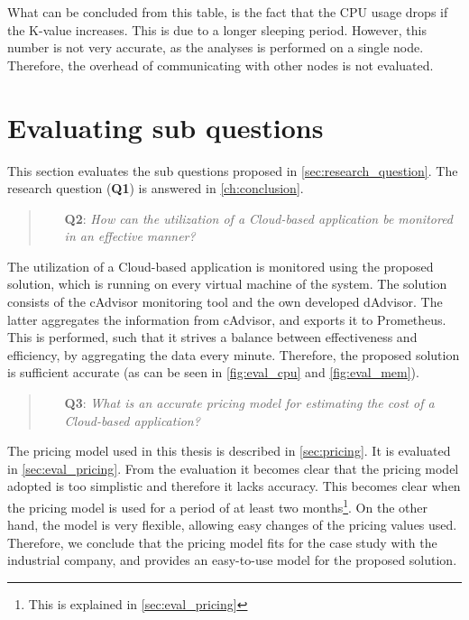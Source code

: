 \noindent
What can be concluded from this table, is the fact that the CPU usage drops if the K-value increases. This is due to a longer sleeping period. However, this number is not very accurate, as the analyses is performed on a single node. Therefore, the overhead of communicating with other nodes is not evaluated.

\section{Evaluating sub questions}
This section evaluates the sub questions proposed in \autoref{sec:research_question}. The research question (\textbf{Q1}) is answered in \autoref{ch:conclusion}.

\begin{quote}
    \begin{itemize}
        \item[\textbf{Q2}: ]\textit{How can the utilization of a Cloud-based application be monitored in an effective manner?}
    \end{itemize}
\end{quote}
\noindent
The utilization of a Cloud-based application is monitored using the proposed solution, which is running on every virtual machine of the system. The solution consists of the cAdvisor monitoring tool and the own developed dAdvisor. The latter aggregates the information from cAdvisor, and exports it to Prometheus. This is performed, such that it strives a balance between effectiveness and efficiency, by aggregating the data every minute. Therefore, the proposed solution is sufficient accurate (as can be seen in \autoref{fig:eval_cpu} and \autoref{fig:eval_mem}).


\begin{quote}
    \begin{itemize}
        \item[\textbf{Q3}: ]\textit{What is an accurate pricing model for estimating the cost of a Cloud-based application?}
    \end{itemize}
\end{quote}
\noindent
The pricing model used in this thesis is described in \autoref{sec:pricing}. It is evaluated in \autoref{sec:eval_pricing}. From the evaluation it becomes clear that the pricing model adopted is too simplistic and therefore it lacks accuracy. This becomes clear when the pricing model is used for a period of at least two months\footnote{This is explained in \autoref{sec:eval_pricing}}. On the other hand, the model is very flexible, allowing easy changes of the pricing values used. Therefore, we conclude that the pricing model fits for the case study with the industrial company, and provides an easy-to-use model for the proposed solution.


